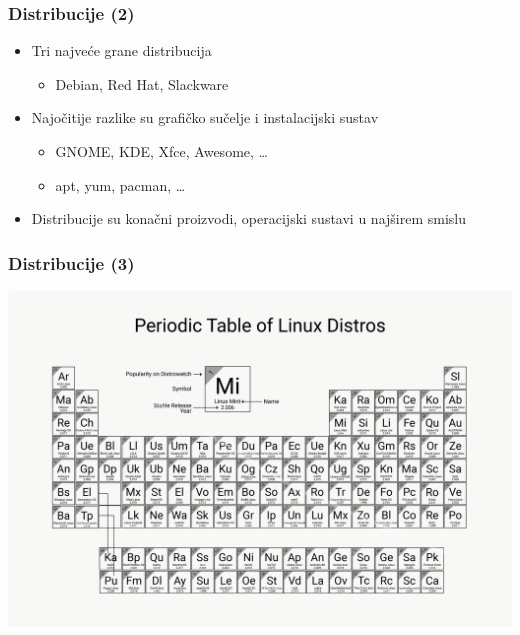 \documentclass{beamer}
\begin{document}
\begin{frame}[t]
\frametitle{Distribucije (2)}
\begin{itemize}
  \item Tri najveće grane distribucija
  \begin{itemize}
    \item Debian, Red Hat, Slackware
  \end{itemize}
  \item Najočitije razlike su grafičko sučelje i instalacijski sustav
  \begin{itemize}
    \item GNOME, KDE, Xfce, Awesome, \ldots
    \item apt, yum, pacman, \ldots
  \end{itemize}
  \item Distribucije su konačni proizvodi, operacijski sustavi u
        najširem smislu
\end{itemize}
\end{frame}

\begin{frame}
\frametitle{Distribucije (3)}
\includegraphics[width=1.0\textwidth,height=0.8\textheight]{periodic-table.png}
\end{frame}
\end{document}
